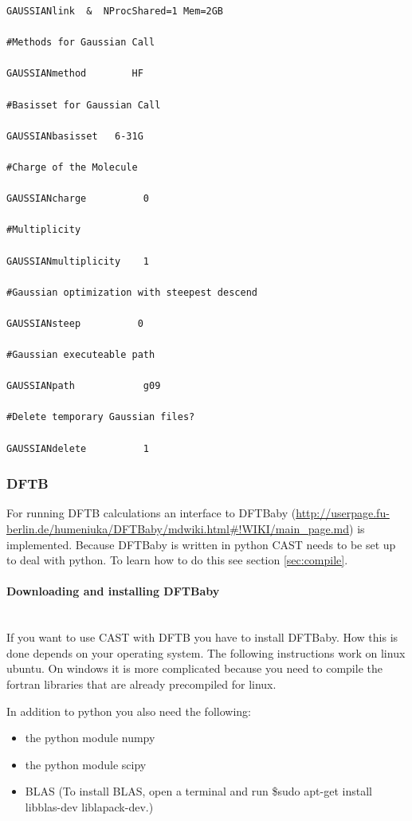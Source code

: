 \documentclass[10pt,a4paper]{article} %
\begin{document}
\begin{lstlisting}
GAUSSIANlink  &  NProcShared=1 Mem=2GB

#Methods for Gaussian Call

GAUSSIANmethod        HF

#Basisset for Gaussian Call

GAUSSIANbasisset   6-31G    

#Charge of the Molecule

GAUSSIANcharge          0

#Multiplicity 

GAUSSIANmultiplicity    1

#Gaussian optimization with steepest descend 

GAUSSIANsteep          0

#Gaussian executeable path 

GAUSSIANpath            g09 

#Delete temporary Gaussian files?

GAUSSIANdelete          1
\end{lstlisting}

\subsubsection{DFTB} \label{sec:DFTB}

For running DFTB calculations an interface to DFTBaby (\url{http://userpage.fu-berlin.de/humeniuka/DFTBaby/mdwiki.html#!WIKI/main_page.md}) is implemented. Because DFTBaby is written in python CAST needs to be set up to deal with python. To learn how to do this see section \ref{sec:compile}.


\paragraph{Downloading and installing DFTBaby}\mbox{}\\

If you want to use CAST with DFTB you have to install DFTBaby. How this is done depends on your operating system. The following instructions work on linux ubuntu. On windows it is more complicated because you need to compile the fortran libraries that are already precompiled for linux.

In addition to python you also need the following:
\begin{itemize}
\item the python module numpy
\item the python module scipy
\item BLAS (To install BLAS, open a terminal and run \$sudo apt-get install libblas-dev liblapack-dev.)
\end{itemize}
\end{document}
